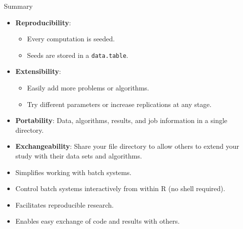 \documentclass[10pt,compress,t,notes=noshow, xcolor=table]{beamer}
\begin{document}
\begin{frame}[fragile]{Summary}
  \begin{itemize}
    \item \textbf{Reproducibility}:
      \begin{itemize}
        \item Every computation is seeded.
        \item Seeds are stored in a \texttt{data.table}.
      \end{itemize}
    \item \textbf{Extensibility}:
      \begin{itemize}
        \item Easily add more problems or algorithms.
        \item Try different parameters or increase replications at any stage.
      \end{itemize}
    \item \textbf{Portability}: Data, algorithms, results, and job information in a single directory.
    \item \textbf{Exchangeability}: Share your file directory to allow others to extend your study with their data sets and algorithms.
    \item Simplifies working with batch systems.
    \item Control batch systems interactively from within R (no shell required).
    \item Facilitates reproducible research.
    \item Enables easy exchange of code and results with others.
  \end{itemize}
\end{frame}

\endlecture
\end{document}
